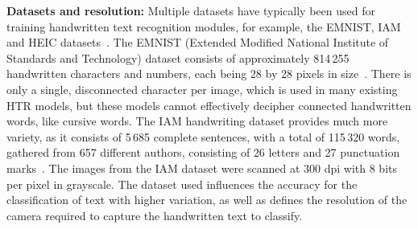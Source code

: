 \textbf{Datasets and resolution:} Multiple datasets have typically been used for training handwritten text recognition modules, for example, the EMNIST, IAM and HEIC datasets~\cite{mamun2024}. The EMNIST (Extended Modified National Institute of Standards and Technology) dataset consists of approximately 814\,255 handwritten characters and numbers, each being 28 by 28 pixels in size~\cite{chen2023}. There is only a single, disconnected character per image, which is used in many existing HTR models, but these models cannot effectively decipher connected handwritten words, like cursive words. The IAM handwriting dataset provides much more variety, as it consists of 5\,685 complete sentences, with a total of 115\,320 words, gathered from 657 different authors, consisting of 26 letters and 27 punctuation marks~\cite{marti2002,ma2023}. The images from the IAM dataset were scanned at 300 dpi with 8 bits per pixel in grayscale. The dataset used influences the accuracy for the classification of text with higher variation, as well as defines the resolution of the camera required to capture the handwritten text to classify. 

